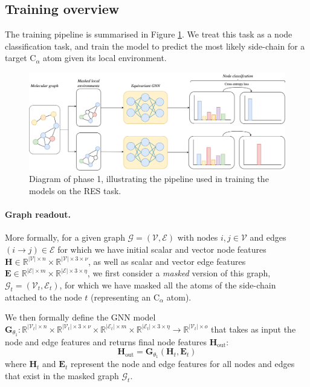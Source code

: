 \subsection{Training overview}
The training pipeline is summarised in Figure \ref{res-task}. We treat this task as a node classification task, and train the model to predict the most likely side-chain for a target $\text{C}_{\alpha}$ atom given its local environment.

\begin{figure}[!h]
    \centering
    \includegraphics[width=\textwidth]{masters-report/figures/training-pipeline.png}
    \caption{Diagram of phase 1, illustrating the pipeline used in training the models on the RES task.}
    \label{res-task}
\end{figure}
\paragraph{Graph readout.} More formally, for a given graph $\mathcal{G} = (\mathcal{V}, \mathcal{E})$ with nodes $i,j \in \mathcal{V}$ and edges $(i \rightarrow j) \in \mathcal{E}$ for which we have initial scalar and vector node features $\mathbf{H}\in\mathbb{R}^{|\mathcal{V}|\times n}\times\mathbb{R}^{|\mathcal{V}|\times 3 \times \nu}$, as well as scalar and vector edge features $\mathbf{E}\in\mathbb{R}^{|\mathcal{E}|\times m}\times\mathbb{R}^{|\mathcal{E}|\times 3 \times \eta}$, we first consider a \textit{masked} version of this graph, $\mathcal{G}_t=(\mathcal{V}_t, \mathcal{E}_t)$, for which we have masked all the atoms of the side-chain attached to the node $t$ (representing an $\text{C}_{\alpha}$ atom). 

We then formally define the GNN model $\mathbf{G}_{\theta_1}:\mathbb{R}^{|\mathcal{V}_t|\times n}\times\mathbb{R}^{|\mathcal{V}_t|\times 3 \times \nu}\times\mathbb{R}^{|\mathcal{E}_t|\times m}\times\mathbb{R}^{|\mathcal{E}_t|\times 3 \times \eta}\rightarrow \mathbb{R}^{|\mathcal{V}_t|\times o}$ that takes as input the node and edge features and returns final node features  $\mathbf{H}_{\text{out}}$:
\begin{equation}
    \mathbf{H}_{\text{out}} = \mathbf{G}_{\theta_1}(\mathbf{H}_t, \mathbf{E}_t)
\end{equation}
where $\mathbf{H}_t$ and $\mathbf{E}_t$ represent the node and edge features for all nodes and edges that exist in the masked graph $\mathcal{G}_t$.


